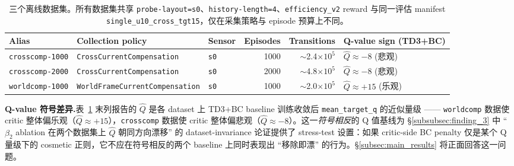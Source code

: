 \begin{table}[t]
\centering
\caption{三个离线数据集。所有数据集共享 \texttt{probe-layout=s0}、\texttt{history-length=4}、\texttt{efficiency\_v2} reward 与同一评估 manifest \texttt{single\_u10\_cross\_tgt15}，仅在采集策略与 episode 预算上不同。}
\label{tab:dataset_matrix}
\small
\begin{tabular}{lllrrl}
\toprule
\textbf{Alias} & \textbf{Collection policy} & \textbf{Sensor} & \textbf{Episodes} & \textbf{Transitions} & \textbf{Q-value sign (TD3+BC)} \\
\midrule
\texttt{crosscomp-1000} & \texttt{CrossCurrentCompensation} & \texttt{s0} & 1000 & $\sim$2.4$\times 10^5$ & $\hat{Q} \approx -8$ (悲观) \\
\texttt{crosscomp-2000} & \texttt{CrossCurrentCompensation} & \texttt{s0} & 2000 & $\sim$4.8$\times 10^5$ & $\hat{Q} \approx -8$ (悲观) \\
\texttt{worldcomp-1000} & \texttt{WorldFrameCurrentCompensation} & \texttt{s0} & 1000 & $\sim$2.0$\times 10^5$ & $\hat{Q} \approx +15$ (乐观) \\
\bottomrule
\end{tabular}
\end{table}

\textbf{Q-value 符号差异.}\quad 表~\ref{tab:dataset_matrix} 末列报告的 $\hat{Q}$ 是各 dataset 上 TD3+BC baseline 训练收敛后 \texttt{mean\_target\_q} 的近似量级 —— \texttt{worldcomp} 数据使 critic 整体偏乐观（$\hat{Q} \approx +15$），\texttt{crosscomp} 数据使 critic 整体偏悲观（$\hat{Q} \approx -8$）。这一\emph{符号相反}的 Q 值基线为 \S\ref{subsubsec:finding_3} 中 ``$\beta_2$ ablation 在两个数据集上 $\hat{Q}$ 朝同方向漂移'' 的 dataset-invariance 论证提供了 stress-test 设置：如果 critic-side BC penalty 仅是某个 Q 量级下的 cosmetic 正则，它不应在符号相反的两个 baseline 上同时表现出 ``移除即漂'' 的行为。\S\ref{subsec:main_results} 将正面回答这一问题。

